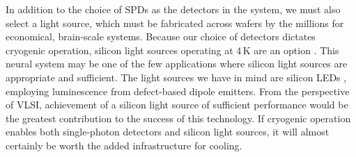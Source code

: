 \documentclass[twocolumn]{article}
\begin{document}
In addition to the choice of SPDs as the detectors in the system, we must also select a light source, which must be fabricated across wafers by the millions for economical, brain-scale systems. Because our choice of detectors dictates cryogenic operation, silicon light sources operating at 4\,K are an option \cite{shxu2007,buch2017}. This neural system may be one of the few applications where silicon light sources are appropriate and sufficient. The light sources we have in mind are silicon LEDs \cite{buch2017}, employing luminescence from defect-based dipole emitters. From the perspective of VLSI, achievement of a silicon light source of sufficient performance would be the greatest contribution to the success of this technology. If cryogenic operation enables both single-photon detectors and silicon light sources, it will almost certainly be worth the added infrastructure for cooling.
\end{document}

